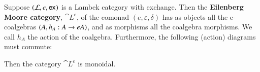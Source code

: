 \begin{definition}
  \label{def:eilenberg-moore-cat}
  Suppose $(\mathcal{L},e,\mathsf{ex}_{})$ is a Lambek category with exchange.  Then
  the \textbf{Eilenberg Moore category}, $\cat{L}^e$, of the comonad
  $(e, \varepsilon, \delta)$ has as objects all the e-coalgebras $(A,
  h_A : A \rightarrow eA)$, and as morphisms all the coalgebra morphisms.  We
  call $h_A$ the action of the coalgebra.  Furthermore, the following
  (action) diagrams must commute:
\end{definition}

\begin{lemma}
  \label{lemma:the_eilenberg_moore_category_is_monoidal}
  Then the category $\cat{L}^e$ is monoidal.
\end{lemma}
